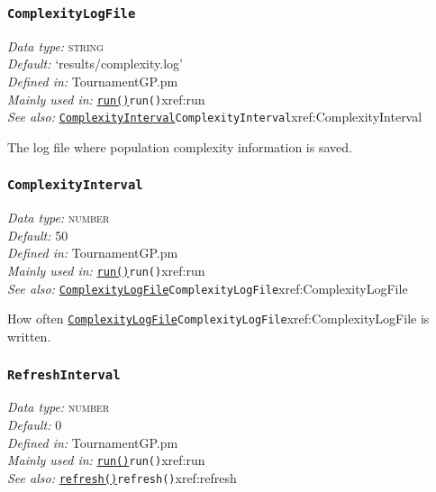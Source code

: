 \documentclass[a4paper]{article}
\begin{document}
\subsubsection{\texttt{ComplexityLogFile}}\label{xref:ComplexityLogFile}
\begin{flushleft}
\textit{Data type:} \textsc{string}\\
\textit{Default:} `results/complexity.log'\\
\textit{Defined in:} TournamentGP.pm\\
\textit{Mainly used in:} \hyperref[no]{\texttt{run()}}{\texttt{run()}}{xref:run}\\
\textit{See also:} \hyperref[no]{\texttt{ComplexityInterval}}{\texttt{ComplexityInterval}}{xref:ComplexityInterval}
\end{flushleft}

The log file where population complexity information is saved.  

\subsubsection{\texttt{ComplexityInterval}}\label{xref:ComplexityInterval}
\begin{flushleft}
\textit{Data type:} \textsc{number}\\
\textit{Default:} 50\\
\textit{Defined in:} TournamentGP.pm\\
\textit{Mainly used in:} \hyperref[no]{\texttt{run()}}{\texttt{run()}}{xref:run}\\
\textit{See also:} \hyperref[no]{\texttt{ComplexityLogFile}}{\texttt{ComplexityLogFile}}{xref:ComplexityLogFile}
\end{flushleft}

How often \hyperref[no]{\texttt{ComplexityLogFile}}{\texttt{ComplexityLogFile}}{xref:ComplexityLogFile} is written.

\subsubsection{\texttt{RefreshInterval}}\label{xref:RefreshInterval}
\begin{flushleft}
\textit{Data type:} \textsc{number}\\
\textit{Default:} 0\\
\textit{Defined in:} TournamentGP.pm\\
\textit{Mainly used in:} \hyperref[no]{\texttt{run()}}{\texttt{run()}}{xref:run}\\
\textit{See also:} \hyperref[no]{\texttt{refresh()}}{\texttt{refresh()}}{xref:refresh}
\end{flushleft}
\end{document}
